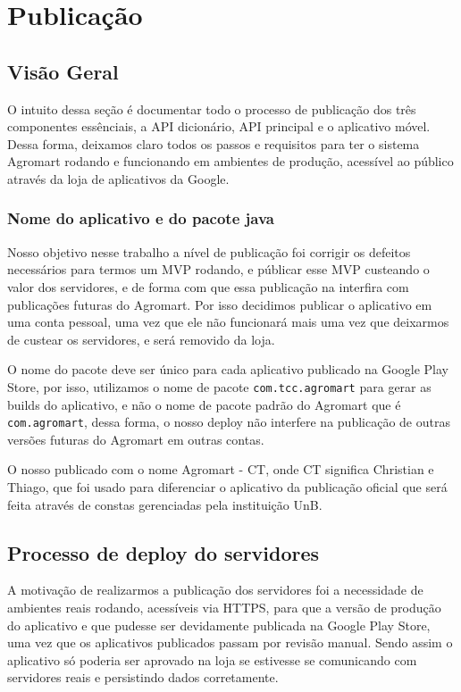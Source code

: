 \chapter[Publicação]{Publicação}
\section{Visão Geral}
O intuito dessa seção é documentar todo o processo de publicação dos três componentes essênciais, a API dicionário, API principal e o aplicativo móvel. Dessa forma, deixamos claro todos os passos e requisitos para ter o sistema Agromart rodando e funcionando em ambientes de produção, acessível ao público através da loja de aplicativos da Google.

\subsection{Nome do aplicativo e do pacote java}
Nosso objetivo nesse trabalho a nível de publicação foi corrigir os defeitos necessários para termos um MVP rodando, e públicar esse MVP custeando o valor dos servidores, e de forma com que essa publicação na interfira com publicações futuras do Agromart. Por isso decidimos publicar o aplicativo em uma conta pessoal, uma vez que ele não funcionará mais uma vez que deixarmos de custear os servidores, e será removido da loja.

O nome do pacote deve ser único para cada aplicativo publicado na Google Play Store, por isso, utilizamos o nome de pacote  \texttt{com.tcc.agromart} para gerar as builds do aplicativo, e não o nome de pacote padrão do Agromart que é \texttt{com.agromart}, dessa forma, o nosso deploy não interfere na publicação de outras versões futuras do Agromart em outras contas.

O nosso publicado com o nome Agromart - CT, onde CT significa Christian e Thiago, que foi usado para diferenciar o aplicativo da publicação oficial que será feita através de constas gerenciadas pela instituição UnB.

\section{Processo de deploy do servidores}
A motivação de realizarmos a publicação dos servidores foi a necessidade de ambientes reais rodando, acessíveis via HTTPS, para que a versão de produção do aplicativo e que pudesse ser devidamente publicada na Google Play Store, uma vez que os aplicativos publicados passam por revisão manual. Sendo assim o aplicativo só poderia ser aprovado na loja se estivesse se comunicando com servidores reais e persistindo dados corretamente.

